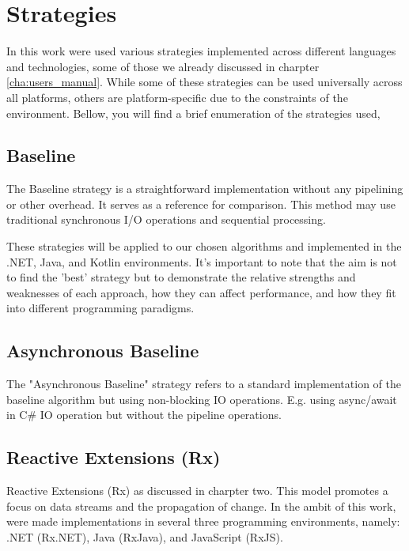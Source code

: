 \clearpage

\section{Strategies}
\label{subsec:strategies}

In this work were used various strategies implemented across different languages and technologies, some of those we already discussed in charpter \ref{cha:users_manual}. While some of these strategies can be used universally across all platforms, others are platform-specific due to the constraints of the environment.
Bellow, you will find a brief enumeration of the strategies used,

\subsection{Baseline}
\label{subsubsec:baseline}
The Baseline strategy is a straightforward implementation without any pipelining or other overhead. It serves as a reference for comparison. This method may use traditional synchronous I/O operations and sequential processing.

These strategies will be applied to our chosen algorithms and implemented in the .NET, Java, and Kotlin environments. It's important to note that the aim is not to find the 'best' strategy but to demonstrate the relative strengths and weaknesses of each approach, how they can affect performance, and how they fit into different programming paradigms.

\subsection{Asynchronous Baseline}
\label{subsubsec:baseline}
The "Asynchronous Baseline" strategy refers to a standard implementation of the baseline algorithm but using non-blocking IO operations. E.g. using async/await in C\# IO operation but without the pipeline operations.

\subsection{Reactive Extensions (Rx)}
\label{subsubsec:rx}
Reactive Extensions (Rx) as discussed in charpter two. This model promotes a focus on data streams and the propagation of change. In the ambit of this work, were made implementations in several three programming environments, namely: .NET (Rx.NET), Java (RxJava), and JavaScript (RxJS).

